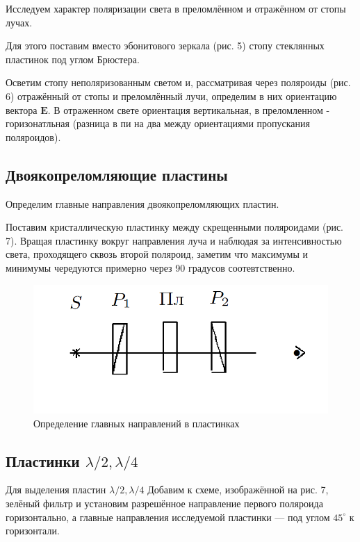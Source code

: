 \documentclass[a4paper, 12pt]{article}
\begin{document}
Исследуем характер поляризации света в преломлённом и отражённом от стопы лучах. 

Для этого поставим вместо эбонитового зеркала (рис. 5) стопу стеклянных пластинок под углом Брюстера.

Осветим стопу неполяризованным светом и, рассматривая через поляроиды (рис. 6) отражённый от стопы и преломлённый лучи, определим в них ориентацию вектора $ \mathbf{E} $. В отраженном свете ориентация вертикальная, в преломленном - горизонатльная (разница в пи на два между ориентациями пропускания поляроидов).

\subsection{Двоякопреломляющие пластины}

Определим главные направления двоякопреломляющих пластин. 

Поставим кристаллическую пластинку между скрещенными поляроидами (рис. 7). Вращая пластинку вокруг направления луча и наблюдая за интенсивностью света, проходящего сквозь второй поляроид, заметим что максимумы и минимумы чередуются примерно через 90 градусов соотевтственно. 

\begin{figure}
	\includegraphics[width=\linewidth]{7}
	\caption{Определение главных
		направлений в пластинках}
	\label{ris 7}
\end{figure}


\subsection{Пластинки $ \lambda/2, \lambda/4 $}

Для выделения пластин $ \lambda/2, \lambda/4 $ Добавим к схеме, изображённой на рис. 7, зелёный фильтр и установим разрешённое направление первого поляроида горизонтально, а главные направления исследуемой пластинки --- под углом $ 45^\circ $ к горизонтали.
\end{document}
